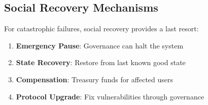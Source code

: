 \subsection{Social Recovery Mechanisms}

For catastrophic failures, social recovery provides a last resort:

\begin{enumerate}
    \item \textbf{Emergency Pause}: Governance can halt the system
    \item \textbf{State Recovery}: Restore from last known good state
    \item \textbf{Compensation}: Treasury funds for affected users
    \item \textbf{Protocol Upgrade}: Fix vulnerabilities through governance
\end{enumerate}

